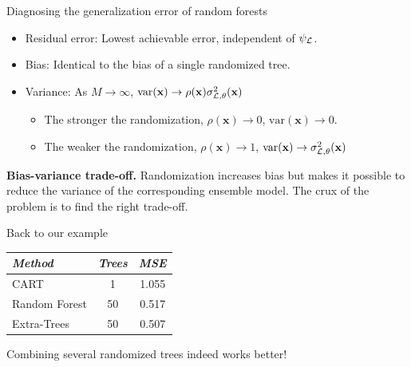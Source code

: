 \documentclass{beamer}
\begin{document}
\begin{frame}{Diagnosing the generalization error of random forests}

\begin{itemize}
\item Residual error: Lowest achievable error, independent of $\psi_{\cal L}$.
\item Bias: {\color{blue} Identical} to the bias of a single randomized tree.
\item Variance: As $M \to \infty$, {\color{red} $\text{var}(\mathbf{x}) \to \rho(\mathbf{x}) \sigma^2_{{\cal L},\theta}(\mathbf{x})$}
  \begin{itemize}
    \item The stronger the randomization, $\rho(\mathbf{x}) \to 0$, $\text{var}(\mathbf{x}) \to 0$.
    \item The weaker the randomization, $\rho(\mathbf{x}) \to 1$, $\text{var}(\mathbf{x}) \to \sigma^2_{{\cal L},\theta}(\mathbf{x})$
  \end{itemize}
\end{itemize}

\vspace{1cm}

{\bf Bias-variance trade-off.} Randomization increases bias but makes it
possible to reduce the variance of the corresponding ensemble model. The crux
of the problem is to {\color{red} find the right trade-off}.

\end{frame}

\begin{frame}{Back to our example}

\begin{table}
    \centering
    \begin{tabular}{| l c c |}
    \hline
        \textit{Method} & \textit{Trees} & \textit{MSE}  \\
    \hline
    \hline
    CART & 1 & 1.055 \\
    Random Forest & 50 & 0.517 \\
    Extra-Trees & 50 & 0.507 \\
    \hline
    \end{tabular}
\end{table}

\vspace{0.5cm}

\begin{center}
Combining several randomized trees indeed works better!
\end{center}

\end{frame}
\end{document}
